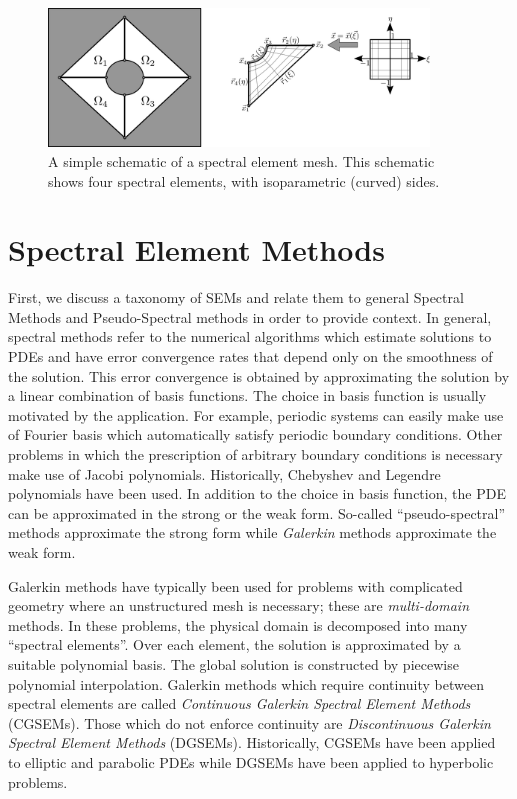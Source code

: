 \documentclass[12pt]{softwaremanual}
\begin{document}
\begin{figure}
\begin{center}
   \includegraphics[width=0.9\textwidth]{../figures/geometry/meshDepiction2D-simple.png}
   \caption{A simple schematic of a spectral element mesh. This schematic shows four spectral elements, with isoparametric (curved) sides. }\label{fig:simplemesh}
\end{center}
\end{figure} 
 
 
\section{Spectral Element Methods} 
First, we discuss a taxonomy of SEMs and relate them to general Spectral Methods and Pseudo-Spectral methods in order to provide context. In general, spectral methods refer to the numerical algorithms which estimate solutions to PDEs and have error convergence rates that depend only on the smoothness of the solution. This error convergence is obtained by approximating the solution by a linear combination of basis functions. The choice in basis function is usually motivated by the application. For example, periodic systems can easily make use of Fourier basis which automatically satisfy periodic boundary conditions. Other problems in which the prescription of arbitrary boundary conditions is necessary make use of Jacobi polynomials. Historically, Chebyshev and Legendre polynomials have been used. In addition to the choice in basis function, the PDE can be approximated in the strong or the weak form. So-called ``pseudo-spectral'' methods approximate the strong form while \textit{Galerkin} methods approximate the weak form. 

Galerkin methods have typically been used for problems with complicated geometry where an unstructured mesh is necessary; these are \textit{multi-domain} methods. In these problems, the physical domain is decomposed into many ``spectral elements''. Over each element, the solution is approximated by a suitable polynomial basis. The global solution is constructed by piecewise polynomial interpolation. Galerkin methods which require continuity between spectral elements are called \textit{Continuous Galerkin Spectral Element Methods} (CGSEMs). Those which do not enforce continuity are \textit{Discontinuous Galerkin Spectral Element Methods} (DGSEMs). Historically, CGSEMs have been applied to elliptic and parabolic PDEs while DGSEMs have been applied to hyperbolic problems.  
\end{document}

